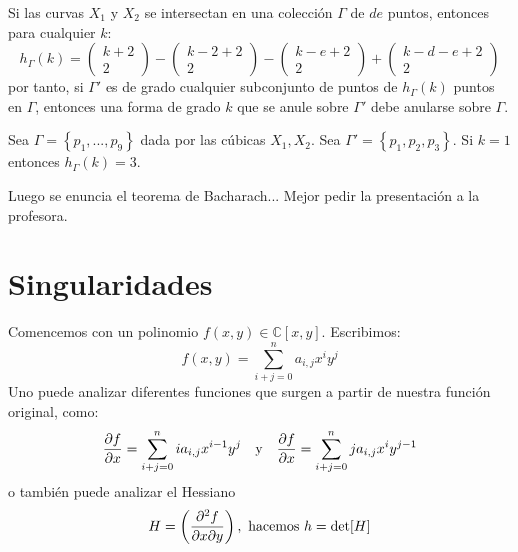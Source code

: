 \documentclass[12pt]{report}
\theoremstyle{largebreak}
\begin{document}
    \begin{propo}
        Si las curvas $X_1$ y $X_2$ se intersectan en una colección $\Gamma$ de $de$ puntos, entonces para cualquier $k$:
    \begin{equation*}
        h_\Gamma(k)=\left(\begin{array}{c}
            k+2 \\
            2
        \end{array} \right)-\left(\begin{array}{c}
            k-2+2 \\
            2
        \end{array} \right)-\left(\begin{array}{c}
            k-e+2\\
            2
        \end{array} \right)+\left(\begin{array}{c}
            k-d-e+2\\
            2
        \end{array} \right)
    \end{equation*}
    por tanto, si $\Gamma'$ es de grado cualquier subconjunto de puntos de $h_\Gamma(k)$ puntos en $\Gamma$, entonces una forma de grado $k$ que se anule sobre $\Gamma'$ debe anularse sobre $\Gamma$.
    \end{propo}

    \begin{exa}
        Sea $\Gamma=\left\{p_1,...,p_9 \right\}$ dada por las cúbicas $X_1,X_2$. Sea $\Gamma'=\left\{p_1,p_2,p_3 \right\}$. Si $k=1$ entonces $h_\Gamma(k)=3$.
    \end{exa}

    Luego se enuncia el teorema de Bacharach... Mejor pedir la presentación a la profesora.

    \chapter{Singularidades}

    Comencemos con un polinomio $f(x,y)\in\mathbb{C}[x,y]$. Escribimos:
    \begin{equation*}
        f(x,y)=\sum_{ i+j=0}^n a_{ i,j}x^iy^j
    \end{equation*}
    Uno puede analizar diferentes funciones que surgen a partir de nuestra función original, como:
    \begin{equation*}
        \frac{\partial f}{\partial x}=\sum_{ i+j=0}^n ia_{ i,j}x^{i-1 }y^j\quad\textup{y}\quad\frac{\partial f}{\partial x}=\sum_{ i+j=0}^n ja_{ i,j}x^{i}y^{j-1}
    \end{equation*}
    o también puede analizar el Hessiano
    \begin{equation*}
        H=\left(\frac{\partial^2 f}{\partial x\partial y}\right),\textup{ hacemos }h=\det[H]
    \end{equation*}
\end{document}
